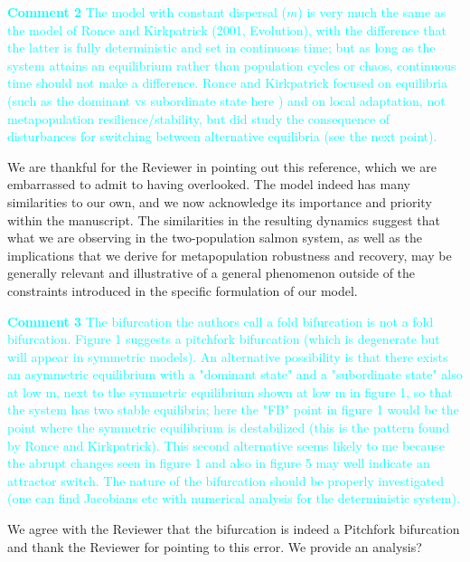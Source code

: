 \documentclass[ucm,12pt]{ucletter}
\begin{document}
\begin{letter}
\noindent \textcolor{cyan}{
{\bf Comment 2} The model with constant dispersal ($m$) is very much the same as the model of Ronce and Kirkpatrick (2001, Evolution), with the difference that the latter is fully deterministic and set in continuous time; but as long as the system attains an equilibrium rather than population cycles or chaos, continuous time should not make a difference. Ronce and Kirkpatrick focused on equilibria (such as the dominant vs subordinate state here ) and on local adaptation, not metapopulation resilience/stability, but did study the consequence of disturbances for switching between alternative equilibria (see the next point).
}

 We are thankful for the Reviewer in pointing out this reference, which we are embarrassed to admit to having overlooked. The model indeed has many similarities to our own, and we now acknowledge its importance and priority within the manuscript. The similarities in the resulting dynamics suggest that what we are observing in the two-population salmon system, as well as the implications that we derive for metapopulation robustness and recovery, may be generally relevant and illustrative of a general phenomenon outside of the constraints introduced in the specific formulation of our model.


\noindent \textcolor{cyan}{
{\bf Comment 3} The bifurcation the authors call a fold bifurcation is not a fold bifurcation. Figure 1 suggests a pitchfork bifurcation (which is degenerate but will appear in symmetric models). An alternative possibility is that there exists an asymmetric equilibrium with a "dominant state" and a "subordinate state" also at low m, next to the symmetric equilibrium shown at low m in figure 1, so that the system has two stable equilibria; here the "FB" point in figure 1 would be the point where the symmetric equilibrium is destabilized (this is the pattern found by Ronce and Kirkpatrick). This second alternative seems likely to me because the abrupt changes seen in figure 1 and also in figure 5 may well indicate an attractor switch. The nature of the bifurcation should be properly investigated (one can find Jacobians etc with numerical analysis for the deterministic system).
}

 We agree with the Reviewer that the bifurcation is indeed a Pitchfork bifurcation and thank the Reviewer for pointing to this error. We provide an analysis?


\end{letter}
\end{document}
